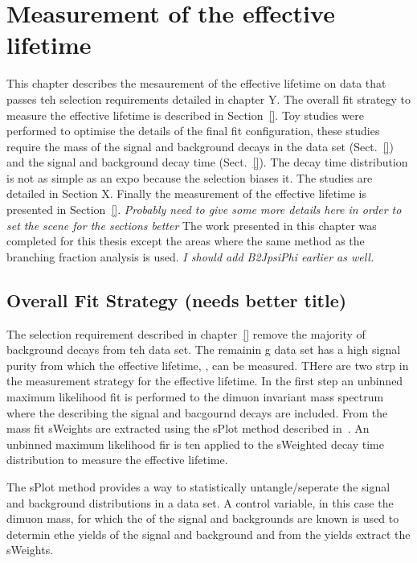 \chapter{Measurement of the \bsmumu effective lifetime}
\label{sec:lifetimemeasurement}

This chapter describes the mesaurement of the \bsmumu effective lifetime on data that passes teh selection requirements detailed in chapter Y. The overall fit strategy to measure the effective lifetime is described in Section~\ref{}. Toy studies were performed to optimise the details of the final fit configuration, these studies require the mass \pdfs of the signal and background decays in the data set (Sect.~\ref{}) and the signal and background decay time \pdfs (Sect.~\ref{}). The decay time distribution is not as simple as an expo because the selection biases it. The studies are detailed in Section X. Finally the measurement of the \bsmumu effective lifetime is presented in Section~\ref{}.
{\it Probably need to give some more details here in order to set the scene for the sections better}
The work presented in this chapter was completed for this thesis except the areas where the same method as the branching fraction analysis is used. 
{\it I should add B2JpsiPhi earlier as well.}

\section{Overall Fit Strategy (needs better title)}
\label{sec:fitstrategy}

The selection requirement described in chapter~\ref{} remove the majority of background decays from teh data set. The remainin g data set has a high signal purity from which the \bsmumu effective lifetime, \tmumu, can be measured. THere are two strp in the measurement strategy for the effective lifetime. In the first step an unbinned maximum likelihood fit is performed to the dimuon invariant mass spectrum where the \pdfs describing the \bsmumu signal and bacgournd decays are included. From the mass fit sWeights are extracted using the sPlot method described in~\cite{}. An unbinned maximum likelihood fir is ten applied to the sWeighted decay time distribution to measure the \bsmumu effective lifetime.

The sPlot method provides a way to statistically untangle/seperate the signal and background distributions in a data set. A control variable, in this case the dimuon mass, for which the \pdfs of the signal and backgrounds are known is used to determin ethe yields of the signal and background and from the yields extract the sWeights. %

